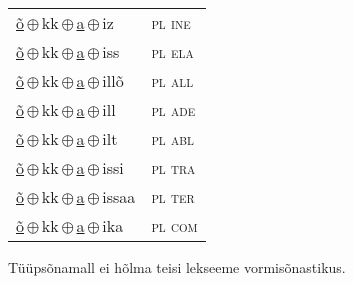 \begin{minipage}{\textwidth}
\begin{sideways}
\begin{tabular}{l l}
\underline{õ}\,$\oplus$\,kk\,$\oplus$\,\underline{a}\,$\oplus$\,iz & \textsc{ pl ine } \\
\underline{õ}\,$\oplus$\,kk\,$\oplus$\,\underline{a}\,$\oplus$\,iss & \textsc{ pl ela } \\
\underline{õ}\,$\oplus$\,kk\,$\oplus$\,\underline{a}\,$\oplus$\,illõ & \textsc{ pl all } \\
\underline{õ}\,$\oplus$\,kk\,$\oplus$\,\underline{a}\,$\oplus$\,ill & \textsc{ pl ade } \\
\underline{õ}\,$\oplus$\,kk\,$\oplus$\,\underline{a}\,$\oplus$\,ilt & \textsc{ pl abl } \\
\underline{õ}\,$\oplus$\,kk\,$\oplus$\,\underline{a}\,$\oplus$\,issi & \textsc{ pl tra } \\
\underline{õ}\,$\oplus$\,kk\,$\oplus$\,\underline{a}\,$\oplus$\,issaa & \textsc{ pl ter } \\
\underline{õ}\,$\oplus$\,kk\,$\oplus$\,\underline{a}\,$\oplus$\,ika & \textsc{ pl com } \\
\end{tabular}
\end{sideways}
\label{tab:tüüpsõnamall-õgaz}

\end{minipage}

 
\vspace{1em}
\noindent Tüüpsõnamall  ei hõlma teisi lekseeme vormi\-sõnastikus.
